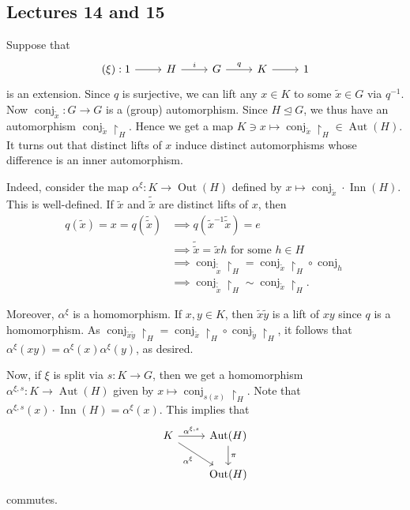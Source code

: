 \documentclass[10pt,letterpaper,cm]{nupset}
\theoremstyle{definition}
\theoremstyle{theorem}
\theoremstyle{remark}
\newcommand{\1}{\mathbf{1}}
\newcommand{\0}{\vec 0}
\DeclareMathOperator{\aut}{Aut}
\DeclareMathOperator{\inn}{Inn}
\DeclareMathOperator{\out}{Out}
\DeclareMathOperator{\conj}{conj}
\begin{document}
\subsection{Lectures 14 and 15}


Suppose that 
\[ 
\begin{tikzcd}
(\xi): 1 \arrow[r] & H \arrow[r, "i"] & G \arrow[r, "q"] & K \arrow[r] & 1
\end{tikzcd}
\]
is an extension. Since $q$ is surjective, we can lift any $x \in K$ to some $\tilde{x}\in G$ via $q^{-1}$. Now $\conj_{\tilde{x}} : G \to G$ is a (group) automorphism. Since $H\unlhd G$, we thus have an automorphism $\conj_{\tilde{x}}\restriction_H$. Hence we get a map $K \ni x \mapsto \conj_{\tilde{x}}\restriction_H \in \aut(H)$. It turns out that distinct lifts of $x$ induce distinct automorphisms whose difference is an inner automorphism.

Indeed, consider the map $\alpha^{\xi} : K \to \out(H)$ defined by $x \mapsto \conj_{\tilde{x}}\cdot \inn(H)$. This is well-defined. If $\tilde{x}$ and $\tilde{\tilde{x}}$ are distinct lifts of $x$, then 
\begin{align*}
q(\tilde{x}) = x = q(\tilde{\tilde{x}}) &\implies q(\tilde{x}^{-1}\tilde{\tilde{x}}) = e 
\\ & \implies \tilde{\tilde{x}} = \tilde{x}h \text{ for some }h \in H 
\\ & \implies \conj_{\tilde{\tilde{x}}}\restriction_H= \conj_{\tilde{x}}\restriction_H \circ \conj_h 
\\ & \implies \conj_{\tilde{\tilde{x}}}\restriction_H\sim \conj_{\tilde{x}}\restriction_H.
\end{align*}

Moreover, $\alpha^{\xi}$ is a homomorphism. If $x, y \in K$, then $\tilde{x}\tilde{y}$ is a lift of $xy$ since $q$ is a homomorphism.  As  $\conj_{\tilde{x}\tilde{y}}\restriction_H = \conj_{\tilde{x}}\restriction_H \circ \conj_{\tilde{y}}\restriction_H$, it follows that $\alpha^{\xi}(xy) = \alpha^{\xi}(x) \alpha^{\xi}(y)$, as desired.

Now, if $\xi$ is split via $s: K \to G$, then we get a homomorphism $\alpha^{\xi, s} : K \to \aut(H)$ given by $x \mapsto \conj_{s(x)}\restriction_H$. Note that $\alpha^{\xi, s}(x)\cdot \inn(H) = \alpha^{\xi}(x)$. This implies that
\[
\begin{tikzcd}
K \arrow[r, "{\alpha^{\xi, s}}"] \arrow[rd, "\alpha^{\xi}"'] & \aut(H) \arrow[d, "\pi"] \\
 & \out(H)
\end{tikzcd}
\]
commutes.
\end{document}
